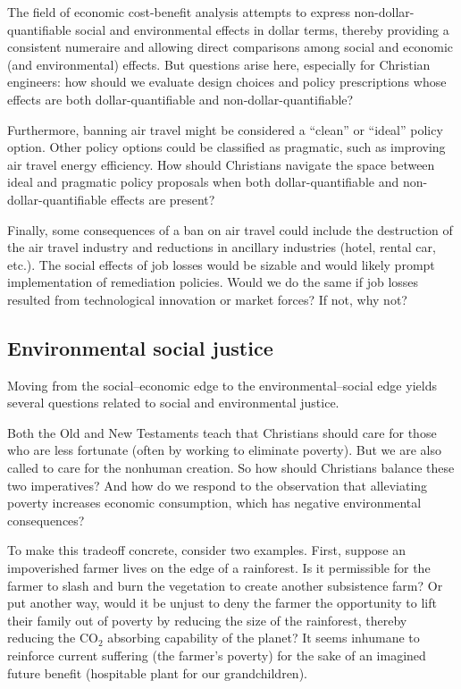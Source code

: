 \documentclass[12pt]{article}
\begin{document}
The field of economic cost-benefit analysis attempts to express non-dollar-quantifiable 
social and environmental effects in dollar terms, 
thereby providing a consistent numeraire and allowing direct comparisons 
among social and economic (and environmental) effects. 
But questions arise here, especially for Christian engineers:
how should we evaluate design choices and policy prescriptions
whose effects are both dollar-quantifiable and non-dollar-quantifiable?

Furthermore, banning air travel might be considered a ``clean'' or ``ideal'' policy option. 
Other policy options could be classified as pragmatic, 
such as improving air travel energy efficiency. 
How should Christians navigate the space between ideal and pragmatic policy proposals
when both dollar-quantifiable and non-dollar-quantifiable effects are present?

Finally, some consequences of a ban on air travel 
could include the destruction of the air travel industry and 
reductions in ancillary industries (hotel, rental car, etc.).
The social effects of job losses would be sizable and 
would likely prompt implementation of remediation policies.
Would we do the same if job losses resulted from technological innovation or market forces?
If not, why not?


\subsection{Environmental social justice}
\label{sec:environmental_social_justice}

Moving from the social--economic edge to the environmental--social edge 
yields several questions related to social and environmental justice. 

Both the Old and New Testaments teach that Christians should care for those who are less fortunate
(often by working to eliminate poverty). 
But we are also called to care for the nonhuman creation.
So how should Christians balance these two imperatives?
And how do we respond to the observation that alleviating poverty 
increases economic consumption, which has negative environmental consequences?

To make this tradeoff concrete, consider two examples.
First, suppose an impoverished farmer lives on the edge of a rainforest. 
Is it permissible for the farmer to slash and burn the vegetation to create another subsistence farm?
Or put another way, would it be unjust to deny the farmer the opportunity to lift their family
out of poverty by reducing the size of the rainforest, 
thereby reducing the CO$_2$ absorbing capability of the planet? 
It seems inhumane to 
reinforce current suffering (the farmer's poverty)
for the sake of an imagined future benefit
(hospitable plant for our grandchildren).
\end{document}
